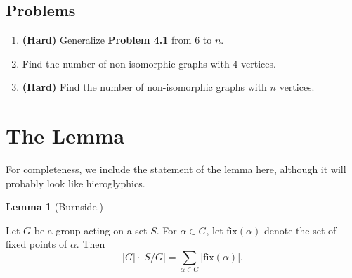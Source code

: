 \documentclass[11pt]{scrartcl}
\begin{document}
\subsection{Problems}
\begin{enumerate}
    \item \textbf{(Hard)} Generalize \color{red} \textbf{Problem 4.1} \color{black} from $6$ to $n$.
    \item Find the number of non-isomorphic graphs with $4$ vertices.
    \item \textbf{(Hard)} Find the number of non-isomorphic graphs with $n$ vertices.
\end{enumerate}

\section{The Lemma}

For completeness, we include the statement of the lemma here, although it will probably look like hieroglyphics.

\begin{tcolorbox}[colback=orange!5!white,colframe=orange!75!black]
  \color{orange} \textbf{Lemma 1} (Burnside.)\color{black}
  \vspace{0.1cm}
  
  Let $G$ be a group acting on a set $S$. For $\alpha \in G$, let $\text{fix}(\alpha)$ denote the set of fixed points of $\alpha$. Then\[\lvert G \rvert \cdot \lvert S/G \rvert = \sum_{\alpha \in G} \lvert \text{fix}(\alpha) \rvert .\]

  
\end{tcolorbox}
\end{document}
